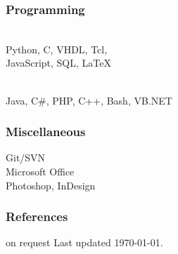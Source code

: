 \documentclass[]{resume}
\begin{document}
\begin{facts}
\subsubsection{Programming}
\\
Python, C, VHDL, Tcl,\\
JavaScript, SQL, LaTeX
\sectionsep

\\
Java, C\#, PHP, C++, Bash, VB.NET
\sectionsep

\subsubsection{Miscellaneous}
Git/SVN\\
Microsoft Office\\
Photoshop, InDesign
\sectionsep

\subsubsection{References}
on request
\vfill
Last updated \today.

\end{facts}%
\end{document}
